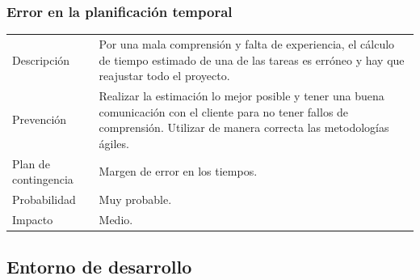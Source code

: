 \subsubsection{Error en la planificaci\'{o}n temporal}
\begin{table}[H]
    \begin{center}
        \begin{tabular}{l p{8cm}}
            Descripci\'{o}n                 & Por una mala comprensi\'on y falta de experiencia, el 
            c\'alculo
            de tiempo estimado de una de las tareas es err\'oneo y hay que reajustar todo el 
            proyecto. \\
            Prevenci\'{o}n                  & Realizar la estimación lo mejor posible y tener una 
            buena
            								  comunicaci\'on con el cliente para no tener fallos 
            								  de comprensión. Utilizar de manera 
            								  correcta las metodolog\'ias \'agiles. \\ 
            Plan de contingencia            & Margen de error en los tiempos. \\
            Probabilidad                    & Muy probable. \\
            Impacto                         & Medio. \\
        \end{tabular}
    \end{center}
    
\end{table}
\subsection{Entorno de desarrollo}
